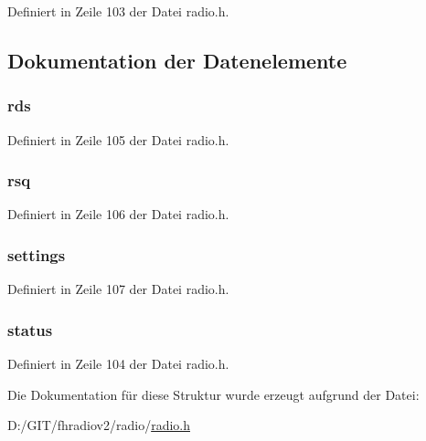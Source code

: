 Definiert in Zeile 103 der Datei radio.\+h.



\subsection{Dokumentation der Datenelemente}
\hypertarget{structradio_a44efb20f93a5de661983c36b4a870f4e}{}
\subsubsection[{rds}]{ {\bf rds}}\label{structradio_a44efb20f93a5de661983c36b4a870f4e}


Definiert in Zeile 105 der Datei radio.\+h.

\hypertarget{structradio_aba45ded08c975dcc6ee7d58687e8534e}{}
\subsubsection[{rsq}]{ rsq}\label{structradio_aba45ded08c975dcc6ee7d58687e8534e}


Definiert in Zeile 106 der Datei radio.\+h.

\hypertarget{structradio_a458724faf4e8216b3d6b8beb9b2894c2}{}
\subsubsection[{settings}]{ settings}\label{structradio_a458724faf4e8216b3d6b8beb9b2894c2}


Definiert in Zeile 107 der Datei radio.\+h.

\hypertarget{structradio_ac40df2ac7cfc276418e34335098903fb}{}
\subsubsection[{status}]{ {\bf status}}\label{structradio_ac40df2ac7cfc276418e34335098903fb}


Definiert in Zeile 104 der Datei radio.\+h.



Die Dokumentation für diese Struktur wurde erzeugt aufgrund der Datei\+:\begin{DoxyCompactItemize}
\item 
D\+:/\+G\+I\+T/fhradiov2/radio/\hyperlink{radio_8h}{radio.\+h}\end{DoxyCompactItemize}
